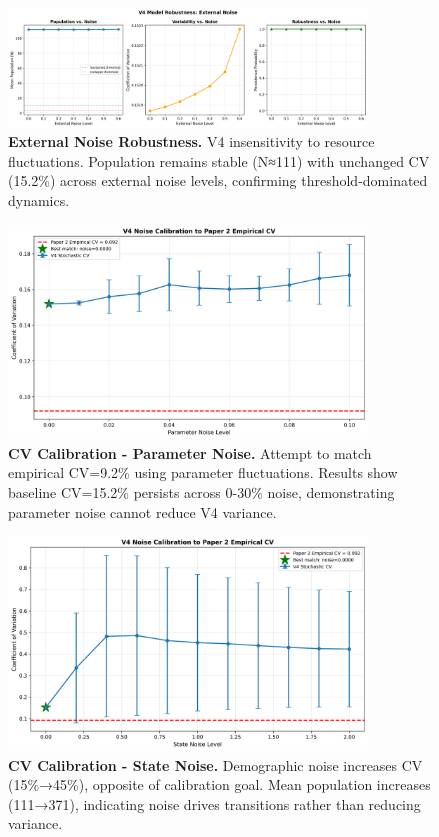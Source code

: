 \documentclass[
]{article}
\begin{document}
\begin{figure}[htbp]
\centering
\includegraphics[width=0.85\textwidth]{figures/paper7_fig10_robustness_external.png}
\caption{\textbf{External Noise Robustness.} V4 insensitivity to resource fluctuations. Population remains stable (N≈111) with unchanged CV (15.2\%) across external noise levels, confirming threshold-dominated dynamics.}
\label{fig:robustness-external}
\end{figure}

\begin{figure}[htbp]
\centering
\includegraphics[width=0.85\textwidth]{figures/paper7_fig11_cv_calibration_parameter.png}
\caption{\textbf{CV Calibration - Parameter Noise.} Attempt to match empirical CV=9.2\% using parameter fluctuations. Results show baseline CV=15.2\% persists across 0-30\% noise, demonstrating parameter noise cannot reduce V4 variance.}
\label{fig:cv-parameter}
\end{figure}

\begin{figure}[htbp]
\centering
\includegraphics[width=0.85\textwidth]{figures/paper7_fig12_cv_calibration_state.png}
\caption{\textbf{CV Calibration - State Noise.} Demographic noise increases CV (15\%→45\%), opposite of calibration goal. Mean population increases (111→371), indicating noise drives transitions rather than reducing variance.}
\label{fig:cv-state}
\end{figure}
\end{document}

